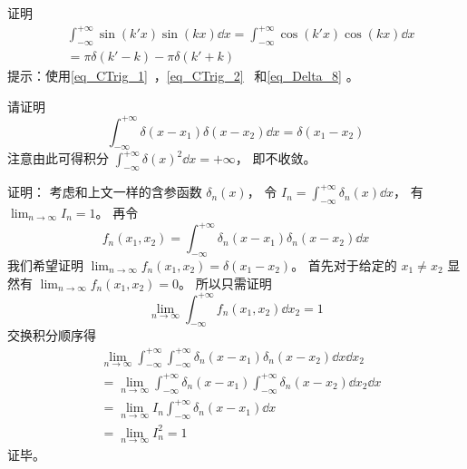 \begin{exercise}{}\label{exe_Delta_3}
证明
\begin{equation}\label{eq_Delta_9}
\begin{aligned}%
&\int_{-\infty}^{+\infty} \sin(k'x) \sin(kx) \dd{x} = \int_{-\infty}^{+\infty} \cos(k'x) \cos(kx) \dd{x}\\
&= \pi\delta(k' - k) - \pi\delta(k' + k)
\end{aligned}
\end{equation}
提示：使用\autoref{eq_CTrig_1}~，\autoref{eq_CTrig_2}~ 和\autoref{eq_Delta_8} 。
\end{exercise}

\begin{example}{}
请证明
\begin{equation}\label{eq_Delta_13}
\int_{-\infty}^{+\infty} \delta(x-x_1) \delta(x-x_2) \dd{x} = \delta(x_1 - x_2)
\end{equation}
注意由此可得积分 $\int_{-\infty}^{+\infty}\delta(x)^2 \dd{x} = +\infty$， 即不收敛。

证明： 考虑和上文一样的含参函数 $\delta_n(x)$， 令 $I_n = \int_{-\infty}^{+\infty} \delta_n(x) \dd{x}$， 有 $\lim_{n\to\infty} I_n = 1$。 再令
\begin{equation}
f_n(x_1, x_2) = \int_{-\infty}^{+\infty} \delta_n(x-x_1) \delta_n(x-x_2) \dd{x}
\end{equation}
我们希望证明 $\lim_{n\to\infty }f_n(x_1, x_2) = \delta(x_1 - x_2)$。 首先对于给定的 $x_1 \ne x_2$ 显然有 $\lim_{n\to\infty }f_n(x_1, x_2) = 0$。 所以只需证明
\begin{equation}
\lim_{n\to\infty }\int_{-\infty}^{+\infty} f_n(x_1, x_2) \dd{x_2} = 1
\end{equation}
交换积分顺序得
\begin{equation}
\begin{aligned}
&\lim_{n\to\infty }\int_{-\infty}^{+\infty}\int_{-\infty}^{+\infty} \delta_n(x-x_1) \delta_n(x-x_2) \dd{x}\dd{x_2}\\
&= \lim_{n\to\infty }\int_{-\infty}^{+\infty} \delta_n(x-x_1) \int_{-\infty}^{+\infty} \delta_n(x-x_2)\dd{x_2} \dd{x}\\
&= \lim_{n\to\infty } I_n \int_{-\infty}^{+\infty} \delta_n(x-x_1)\dd{x}\\
&= \lim_{n\to\infty } I_n^2 = 1
\end{aligned}
\end{equation}
证毕。
\end{example}
